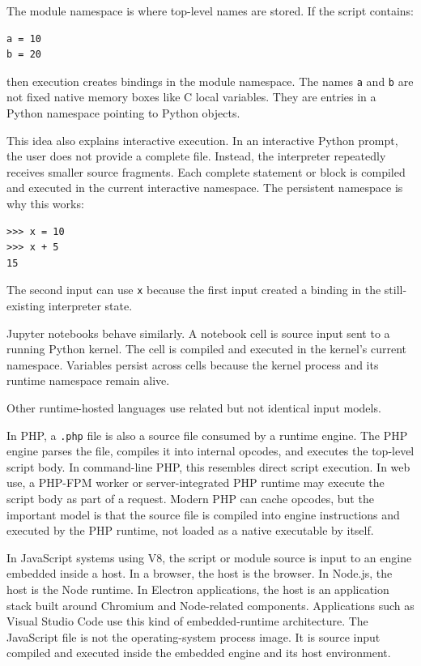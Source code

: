 The module namespace is where top-level names are stored. If the script contains:

\begin{verbatim}
a = 10
b = 20
\end{verbatim}

then execution creates bindings in the module namespace. The names \texttt{a} and \texttt{b} are not fixed native memory boxes like C local variables. They are entries in a Python namespace pointing to Python objects.

This idea also explains interactive execution. In an interactive Python prompt, the user does not provide a complete file. Instead, the interpreter repeatedly receives smaller source fragments. Each complete statement or block is compiled and executed in the current interactive namespace. The persistent namespace is why this works:

\begin{verbatim}
>>> x = 10
>>> x + 5
15
\end{verbatim}

The second input can use \texttt{x} because the first input created a binding in the still-existing interpreter state.

Jupyter notebooks behave similarly. A notebook cell is source input sent to a running Python kernel. The cell is compiled and executed in the kernel's current namespace. Variables persist across cells because the kernel process and its runtime namespace remain alive.

Other runtime-hosted languages use related but not identical input models.

In PHP, a \texttt{.php} file is also a source file consumed by a runtime engine. The PHP engine parses the file, compiles it into internal opcodes, and executes the top-level script body. In command-line PHP, this resembles direct script execution. In web use, a PHP-FPM worker or server-integrated PHP runtime may execute the script body as part of a request. Modern PHP can cache opcodes, but the important model is that the source file is compiled into engine instructions and executed by the PHP runtime, not loaded as a native executable by itself.

In JavaScript systems using V8, the script or module source is input to an engine embedded inside a host. In a browser, the host is the browser. In Node.js, the host is the Node runtime. In Electron applications, the host is an application stack built around Chromium and Node-related components. Applications such as Visual Studio Code use this kind of embedded-runtime architecture. The JavaScript file is not the operating-system process image. It is source input compiled and executed inside the embedded engine and its host environment.

